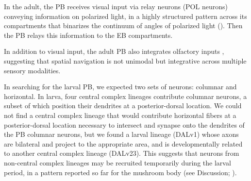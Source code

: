 \documentclass{article}
\begin{document}
In the adult, the PB receives visual input via relay neurons (POL neurons) conveying information on polarized light, in a highly structured pattern across its compartments that binarizes the continuum of angles of polarized light (\citep{heinze2009transformation}). Then the PB relays this information to the EB compartments.

In addition to visual input, the adult PB also integrates olfactory inputs \citep{hulse2021connectome}, suggesting that spatial navigation is not unimodal but integrative across multiple sensory modalities.

In searching for the larval PB, we expected two sets of neurons: columnar and horizontal. In larva, four central complex lineages contribute columnar neurons, a subset of which position their dendrites at a posterior-dorsal location. We could not find a central complex lineage that would contribute horizontal fibers at a posterior-dorsal location necessary to intersect and synapse onto the dendrites of the PB columnar neurons, but we found a larval lineage (DALv1) whose axons are bilateral and project to the appropriate area, and is developmentally related to another central complex lineage (DALv23).
This suggests that neurons from non-central complex lineages may be recruited temporarily during the larval period, in a pattern reported so far for the mushroom body (see Discussion; \citep{truman2023metamorphosis}). 

\end{document}
